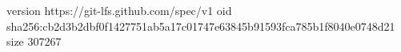 version https://git-lfs.github.com/spec/v1
oid sha256:cb2d3b2dbf0f1427751ab5a17c01747e63845b91593fca785b1f8040e0748d21
size 307267
